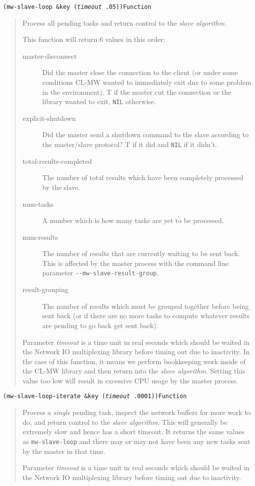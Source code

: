 \documentclass[titlepage,12pt]{book}
\newcommand{\xsmall}{\latexhtml{\small}{}}
\newcommand{\xnormalsize}{\latexhtml{\normalsize}{}}
\newcommand{\clmw}{\xsmall\textsc{CL-MW}\xnormalsize\xspace}
\newcommand{\sa}{\textit{slave algorithm}\xspace}
\newcommand{\dash}{\texttt{-}}
\newcommand{\func}[1]{\mbox{\texttt{#1}}\xspace}
\newcommand{\bool}[1]{\texttt{#1}\xspace}
\newcommand{\Option}[1]{\dash\dash\texttt{#1}}
\newcommand{\apifunc}[2]{\noindent\xsmall\texttt{(#1)}\hspace*{\fill}\xnormalsize\texttt{#2}}
\newenvironment{apientry}[2]
	{\apifunc{#1}{#2}\begin{quotation}}
	{\end{quotation}}
\begin{document}
\begin{apientry}
{mw-slave-loop \&key (\emph{timeout} .05)}
{Function}
Process all pending tasks and return control to the \sa.

This function will return 6 values in this order:
\begin{description}
\item[master-disconnect]
	Did the master close the connection to the client (or under some conditions
	\clmw wanted to immediately exit due to some problem in the environment).
	T if the master cut the connection or the library wanted to exit, 
	\bool{NIL} otherwise.
\item[explicit-shutdown]
	Did the master send a shutdown command to the slave according to the
	master/slave protocol?  T if it did and \bool{NIL} if it didn't.
\item[total-results-completed]
	The number of total results which have been completely processed by the 
	slave.
\item[num-tasks]
	A number which is how many tasks are yet to be processed.
\item[num-results]
	The number of results that are currently waiting to be sent back. This is 
	affected by the master process with the command line parameter 
	\Option{mw-slave-result-group}.
\item[result-grouping]
	The number of results which must be grouped together before being sent
	back (or if there are no more tasks to compute whatever results are
	pending to go back get sent back).
\end{description}

Parameter \emph{timeout} is a time unit in real seconds which should
be waited in the Network IO multiplexing library before timing out
due to inactivity.  In the case of this function, it means we perform
bookkeeping work inside of the \clmw library and then return into
the \sa.  Setting this value too low will result in excessive CPU
usage by the master process.

\end{apientry}

\begin{apientry}
{mw-slave-loop-iterate \&key (\emph{timeout} .0001)}
{Function}
Process a \emph{single} pending task, inspect the network buffers for
more work to do, and return control to the \sa. This will generally
be extremely slow and hence has a short timeout. It returns the same values
as \func{mw-slave-loop} and there may or may not have been any new tasks
sent by the master in that time.

Parameter \emph{timeout} is a time unit in real seconds which should
be waited in the Network IO multiplexing library before timing out
due to inactivity.
\end{apientry}
\end{document}
